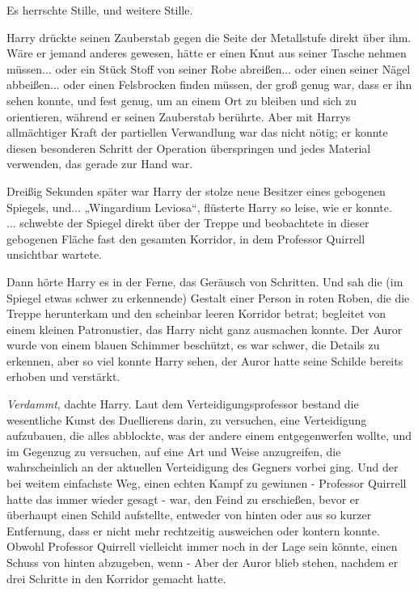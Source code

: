 {Es herrschte Stille, und weitere Stille.

Harry drückte seinen Zauberstab gegen die Seite der Metallstufe direkt über ihm. Wäre er jemand anderes gewesen, hätte er einen Knut aus seiner Tasche nehmen müssen... oder ein Stück Stoff von seiner Robe abreißen... oder einen seiner Nägel abbeißen... oder einen Felsbrocken finden müssen, der groß genug war, dass er ihn sehen konnte, und fest genug, um an einem Ort zu bleiben und sich zu orientieren, während er seinen Zauberstab berührte. Aber mit Harrys allmächtiger Kraft der partiellen Verwandlung war das nicht nötig; er konnte diesen besonderen Schritt der Operation überspringen und jedes Material verwenden, das gerade zur Hand war.

Dreißig Sekunden später war Harry der stolze neue Besitzer eines gebogenen Spiegels, und... „Wingardium Leviosa“, flüsterte Harry so leise, wie er konnte.\\ ... schwebte der Spiegel direkt über der Treppe und beobachtete in dieser gebogenen Fläche fast den gesamten Korridor, in dem Professor Quirrell unsichtbar wartete.

Dann hörte Harry es in der Ferne, das Geräusch von Schritten. Und sah die (im Spiegel etwas schwer zu erkennende) Gestalt einer Person in roten Roben, die die Treppe herunterkam und den scheinbar leeren Korridor betrat; begleitet von einem kleinen Patronustier, das Harry nicht ganz ausmachen konnte. Der Auror wurde von einem blauen Schimmer beschützt, es war schwer, die Details zu erkennen, aber so viel konnte Harry sehen, der Auror hatte seine Schilde bereits erhoben und verstärkt.

\emph{Verdammt}, dachte Harry. Laut dem Verteidigungsprofessor bestand die wesentliche Kunst des Duellierens darin, zu versuchen, eine Verteidigung aufzubauen, die alles abblockte, was der andere einem entgegenwerfen wollte, und im Gegenzug zu versuchen, auf eine Art und Weise anzugreifen, die wahrscheinlich an der aktuellen Verteidigung des Gegners vorbei ging. Und der bei weitem einfachste Weg, einen echten Kampf zu gewinnen - Professor Quirrell hatte das immer wieder gesagt - war, den Feind zu erschießen, bevor er überhaupt einen Schild aufstellte, entweder von hinten oder aus so kurzer Entfernung, dass er nicht mehr rechtzeitig ausweichen oder kontern konnte. Obwohl Professor Quirrell vielleicht immer noch in der Lage sein könnte, einen Schuss von hinten abzugeben, wenn - Aber der Auror blieb stehen, nachdem er drei Schritte in den Korridor gemacht hatte.

}
